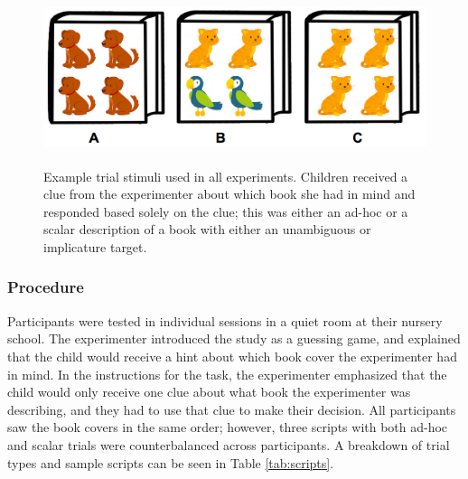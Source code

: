 \documentclass[man]{apa2}
\begin{document}
\begin{figure}
 \begin{center} 
  \includegraphics[height=2in]{figures/implicatures_demo_letters.png}
  \caption{\label{fig:demo} Example trial stimuli used in all experiments. Children received a clue from the experimenter about which book she had in mind and responded based solely on the clue; this was either an ad-hoc or a scalar description of a book with either an unambiguous or implicature target.} 
 \end{center} 
\end{figure}

\subsubsection{Procedure}
Participants were tested in individual sessions in a quiet room at their nursery school. The experimenter introduced the study as a guessing game, and explained that the child would receive a hint about which book cover the experimenter had in mind. In the instructions for the task, the experimenter emphasized that the child would only receive one clue about what book the experimenter was describing, and they had to use that clue to make their decision. All participants saw the book covers in the same order; however, three scripts with both ad-hoc and scalar trials were counterbalanced across participants. A breakdown of trial types and sample scripts can be seen in Table \ref{tab:scripts}. 
\end{document}
